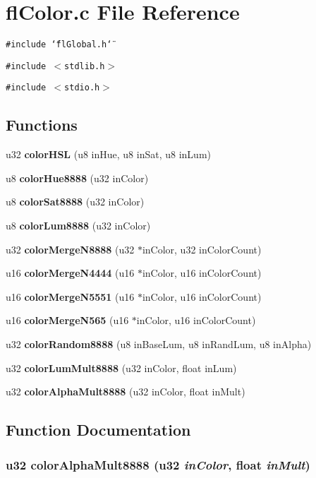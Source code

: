 \section{fl\-Color.c File Reference}
\label{flColor_8c}
{\tt \#include \char`\"{}fl\-Global.h\char`\"{}}\par
{\tt \#include $<$stdlib.h$>$}\par
{\tt \#include $<$stdio.h$>$}\par
\subsection*{Functions}
\begin{CompactItemize}
\item 
u32 {\bf color\-HSL} (u8 in\-Hue, u8 in\-Sat, u8 in\-Lum)
\item 
u8 {\bf color\-Hue8888} (u32 in\-Color)
\item 
u8 {\bf color\-Sat8888} (u32 in\-Color)
\item 
u8 {\bf color\-Lum8888} (u32 in\-Color)
\item 
u32 {\bf color\-Merge\-N8888} (u32 $\ast$in\-Color, u32 in\-Color\-Count)
\item 
u16 {\bf color\-Merge\-N4444} (u16 $\ast$in\-Color, u16 in\-Color\-Count)
\item 
u16 {\bf color\-Merge\-N5551} (u16 $\ast$in\-Color, u16 in\-Color\-Count)
\item 
u16 {\bf color\-Merge\-N565} (u16 $\ast$in\-Color, u16 in\-Color\-Count)
\item 
u32 {\bf color\-Random8888} (u8 in\-Base\-Lum, u8 in\-Rand\-Lum, u8 in\-Alpha)
\item 
u32 {\bf color\-Lum\-Mult8888} (u32 in\-Color, float in\-Lum)
\item 
u32 {\bf color\-Alpha\-Mult8888} (u32 in\-Color, float in\-Mult)
\end{CompactItemize}


\subsection{Function Documentation}
\subsubsection{\setlength{\rightskip}{0pt plus 5cm}u32 color\-Alpha\-Mult8888 (u32 {\em in\-Color}, float {\em in\-Mult})}\label{flColor_8c_fb596a1100915bb37f2077abd553b0f4}




